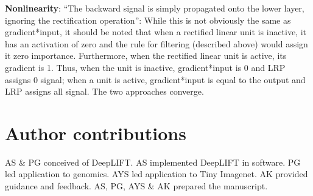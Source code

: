 \documentclass{article}
\begin{document}
{\bf Nonlinearity}: ``The backward signal is simply propagated onto the lower layer, ignoring the rectification operation'': While this is not obviously the same as gradient*input, it should be noted that when a rectified linear unit is inactive, it has an activation of zero and the rule for filtering (described above) would assign it zero importance. Furthermore, when the rectified linear unit is active, its gradient is 1. Thus, when the unit is inactive, gradient*input is 0 and LRP assigns 0 signal; when a unit is active, gradient*input is equal to the output and LRP assigns all signal. The two approaches converge.

\section{Author contributions}

AS \& PG conceived of DeepLIFT. AS implemented DeepLIFT in software. PG led application to genomics. AYS led application to Tiny Imagenet. AK provided guidance and feedback. AS, PG, AYS \& AK prepared the manuscript.

\nocite{*}


\end{document}
